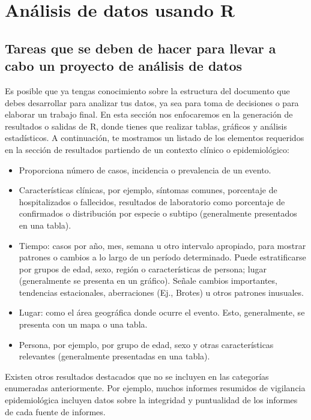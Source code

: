 \documentclass[
  letterpaper,
  DIV=11,
  numbers=noendperiod]{scrreprt}
\begin{document}

\chapter{Análisis de datos usando
R}\label{anuxe1lisis-de-datos-usando-r}

\section{Tareas que se deben de hacer para llevar a cabo un proyecto de
análisis de
datos}\label{tareas-que-se-deben-de-hacer-para-llevar-a-cabo-un-proyecto-de-anuxe1lisis-de-datos}

Es posible que ya tengas conocimiento sobre la estructura del documento
que debes desarrollar para analizar tus datos, ya sea para toma de
decisiones o para elaborar un trabajo final. En esta sección nos
enfocaremos en la generación de resultados o salidas de R, donde tienes
que realizar tablas, gráficos y análisis estadísticos. A continuación,
te mostramos un listado de los elementos requeridos en la sección de
resultados partiendo de un contexto clínico o epidemiológico:

\begin{itemize}
\item
  Proporciona número de casos, incidencia o prevalencia de un evento.
\item
  Características clínicas, por ejemplo, síntomas comunes, porcentaje de
  hospitalizados o fallecidos, resultados de laboratorio como porcentaje
  de confirmados o distribución por especie o subtipo (generalmente
  presentados en una tabla).
\item
  Tiempo: casos por año, mes, semana u otro intervalo apropiado, para
  mostrar patrones o cambios a lo largo de un período determinado. Puede
  estratificarse por grupos de edad, sexo, región o características de
  persona; lugar (generalmente se presenta en un gráfico). Señale
  cambios importantes, tendencias estacionales, aberraciones (Ej.,
  Brotes) u otros patrones inusuales.
\item
  Lugar: como el área geográfica donde ocurre el evento. Esto,
  generalmente, se presenta con un mapa o una tabla.
\item
  Persona, por ejemplo, por grupo de edad, sexo y otras características
  relevantes (generalmente presentadas en una tabla).
\end{itemize}

Existen otros resultados destacados que no se incluyen en las categorías
enumeradas anteriormente. Por ejemplo, muchos informes resumidos de
vigilancia epidemiológica incluyen datos sobre la integridad y
puntualidad de los informes de cada fuente de informes.
\end{document}
